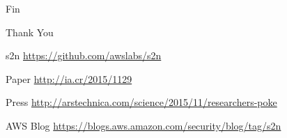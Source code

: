 \documentclass[presentation,smaller]{beamer}
\begin{document}
\begin{frame}[label={sec:orgheadline30}]{Fin}
\begin{center}
\begin{Huge}
\alert{Thank You}
\end{Huge}
\end{center}

\alert{s2n} \url{https://github.com/awslabs/s2n}

\alert{Paper} \url{http://ia.cr/2015/1129}

\alert{Press} \url{http://arstechnica.com/science/2015/11/researchers-poke}

\alert{AWS Blog} \url{https://blogs.aws.amazon.com/security/blog/tag/s2n}
\end{frame}
\end{document}
